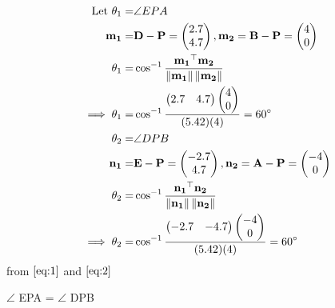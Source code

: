 \documentclass[10pt]{article}
\newcommand{\myvec}[1]{\ensuremath{\begin{pmatrix}#1\end{pmatrix}}}
\providecommand{\norm}[1]{\left\lVert#1\right\rVert}
\let\vec\mathbf{}
\begin{document}
\begin{align}
\text{ Let  }\theta_1=&\angle EPA\\
\vec{m_1}=&\vec{D}-\vec{P}=\myvec{2.7\\4.7}, \vec{m_2}=\vec{B}-\vec{P}=\myvec{4\\0}\\
\theta_1=&\cos^{-1}\frac{\vec{m_1}^\top\vec{m_2}}{\norm{\vec{m_1}}\norm{\vec{m_2}}}\\
\implies\theta_1=&\cos^{-1}\frac{\myvec{2.7&4.7}\myvec{4\\0}}{(5.42)(4)}=60\degree
\label{eq:1}\\
\theta_2=&\angle DPB\\
\vec{n_1}=&\vec{E}-\vec{P}=\myvec{-2.7\\4.7}, \vec{n_2}=\vec{A}-\vec{P}=\myvec{-4\\0}\\
\theta_2 =& \cos^{-1}\frac{\vec{n_1}^\top\vec{n_2}}{\norm{\vec{n_1}}\norm{\vec{n_2}}}\\
\implies\theta_2=&\cos^{-1}\frac{\myvec{-2.7&-4.7}\myvec{-4\\0}}{(5.42)(4)}=60\degree
\label{eq:2}
\end{align}
from $\eqref{eq:1}$ and $\eqref{eq:2}$
\begin{center}
$\angle$ EPA = $\angle$ DPB
\end{center}
\end{document}
